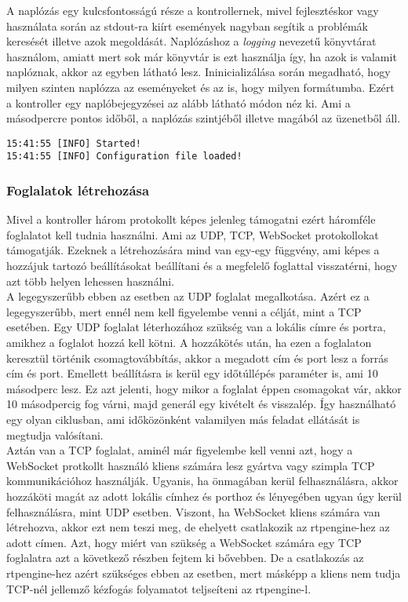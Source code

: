 A naplózás egy kulcsfontosságú része a kontrollernek, mivel fejlesztéskor vagy használata
során az stdout-ra kiírt események nagyban segítik a problémák keresését illetve azok 
megoldását. Naplózáshoz a \textit{logging} nevezetű könyvtárat használom, amiatt mert 
sok már könyvtár is ezt használja így, ha azok is valamit naplóznak, akkor az egyben 
látható lesz. Ininicializálása során megadható, hogy milyen szinten naplózza az eseményeket 
és az is, hogy milyen formátumba. Ezért a kontroller egy naplóbejegyzései az alább látható 
módon néz ki. Ami a másodpercre pontos időből, a naplózás szintjéből illetve magából az 
üzenetből áll.

\begin{lstlisting}
15:41:55 [INFO] Started!
15:41:55 [INFO] Configuration file loaded!
\end{lstlisting}

\subsubsection{Foglalatok létrehozása}

Mivel a kontroller három protokollt képes jelenleg támogatni ezért háromféle foglalatot 
kell tudnia használni. Ami az UDP, TCP, WebSocket protokollokat támogatják. Ezeknek a
létrehozására mind van egy-egy függvény, ami képes a hozzájuk tartozó beállításokat 
beállítani és a megfelelő foglattal visszatérni, hogy azt több helyen lehessen használni. \\

A legegyszerűbb ebben az esetben az UDP foglalat megalkotása. Azért ez a legegyszerűbb,
mert ennél nem kell figyelembe venni a célját, mint a TCP esetében. Egy UDP foglalat 
léterhozához szükség van a lokális címre és portra, amikhez a foglalot hozzá kell 
kötni. A hozzákötés után, ha ezen a foglalaton keresztül történik csomagtovábbítás, 
akkor a megadott cím és port lesz a forrás cím és port. Emellett beállításra is
kerül egy időtúllépés paraméter is, ami 10 másodperc lesz. Ez azt jelenti, hogy
mikor a foglalat éppen csomagokat vár, akkor 10 másodpercig fog várni, majd generál 
egy kivételt és visszalép. Így használható egy olyan ciklusban, ami időközönként
valamilyen más feladat ellátását is megtudja valósítani. \\

Aztán van a TCP foglalat, aminél már figyelembe kell venni azt, hogy a WebSocket
protkollt használó kliens számára lesz gyártva vagy szimpla TCP kommunikációhoz 
használják. Ugyanis, ha önmagában kerül felhasználásra, akkor hozzáköti magát
az adott lokális címhez és porthoz és lényegében ugyan úgy kerül felhasználásra,
mint UDP esetben. Viszont, ha WebSocket kliens számára van létrehozva, akkor ezt
nem teszi meg, de ehelyett csatlakozik az rtpengine-hez az adott címen. Azt, hogy
miért van szükség a WebSocket számára egy TCP foglalatra azt a következő részben 
fejtem ki bővebben. De a csatlakozás az rtpengine-hez azért szükséges ebben az
esetben, mert másképp a kliens nem tudja TCP-nél jellemző kézfogás folyamatot
teljseíteni az rtpengine-l. \\

